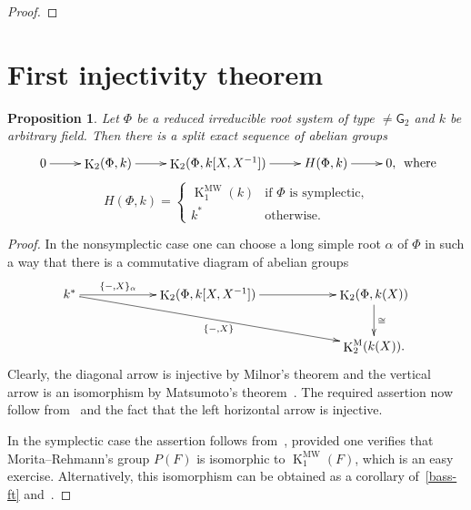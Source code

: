 \documentclass[oneside, 8pt]{amsart}
\newtheorem{prop}{Proposition}
\theoremstyle{remark}
\theoremstyle{definition}
\DeclareMathOperator{\K}{K}
\newcommand{\rG}{\mathsf{G}}
\numberwithin{equation}{section}
\begin{document}
\begin{proof}
\begin{comment}
\begin{multline} 
 [x_\alpha(m), x_{-\alpha}(X\xi)] = [x_\alpha(m), [x_{-\alpha-\beta}(N_{-\alpha-\beta, \beta} X), x_{\beta}(\xi)]] = \\ = \left([[ x_\alpha(m), x_{-\alpha-\beta}(-N_{-\alpha-\beta, \beta}X)], x_{\beta}(\xi)] ^ {x_\alpha(-m)} \cdot  [[ x_{\beta}(-\xi), x_\alpha(m)], x_{-\alpha-\beta}(-N_{-\alpha-\beta, \beta}X)] ^ {x_{\beta}(-\xi)}\right)^{x_{-\alpha-\beta}(-N_{-\alpha-\beta, \beta}X)} = \\ = \left([x_{-\beta}(-N_{-\alpha-\beta,\beta}N_{\alpha,-\alpha-\beta}mX), x_{\beta}(\xi)] ^ {x_\alpha(-m)} \cdot  [ x_{\alpha + \beta}(-N_{\beta, \alpha}m\xi), x_{-\alpha-\beta}(-N_{-\alpha-\beta, \beta}X)] ^ {x_{\beta}(-\xi)}\right)^{x_{-\alpha-\beta}(-N_{-\alpha-\beta, \beta}X)} =
\end{multline}
\end{comment}
\end{proof}


\section{First injectivity theorem}
\begin{prop} Let $\Phi$ be a reduced irreducible root system of type $\neq \rG_2$ and $k$ be arbitrary field.
Then there is a split exact sequence of abelian groups
\[ \xymatrix{ 0 \ar[r] & \K_2(\Phi, k) \ar[r] & \K_2(\Phi, k[X, X^{-1}]) \ar[r] & H(\Phi, k) \ar[r] & 0,}\text{ where} \]
\[ H(\Phi, k) = \left\{\begin{array}{ll} \K_1^\mathrm{MW}(k)& \text{if $\Phi$ is symplectic,}\\ k^* & \text{otherwise.}  \end{array}\right. \]  \end{prop}
\begin{proof} In the nonsymplectic case one can choose a long simple root $\alpha$ of $\Phi$ in such a way that there is a commutative diagram of abelian groups
\[\xymatrixcolsep{5pc}\xymatrix{k^* \ar[r]^-{\{ -, X \}_{\alpha}} \ar[rrd]_{\{-, X\}} & \K_2(\Phi, k[X, X^{-1}]) \ar[r] & \K_2(\Phi, k(X)) \ar[d]^{\cong} \\
                                                                                      &                                 & \K_2^\mathrm{M}(k(X)).} \]
Clearly, the diagonal arrow is injective by Milnor's theorem and the vertical arrow is an isomorphism by Matsumoto's theorem~\cite[Theorem~5.10]{Ma69}.
The required assertion now follow from~\cite[Satz~3]{Hur77} and the fact that the left horizontal arrow is injective.

In the symplectic case the assertion follows from~\cite[Theorem~B]{MR91}, provided one verifies that Morita--Rehmann's group $P(F)$ is isomorphic to $\K_1^\mathrm{MW}(F)$,
 which is an easy exercise. Alternatively, this isomorphism can be obtained as a corollary of~\cref{bass-ft} and~\cite[Lemma~4.1.1]{AF17}. \end{proof}
 
\end{document}
